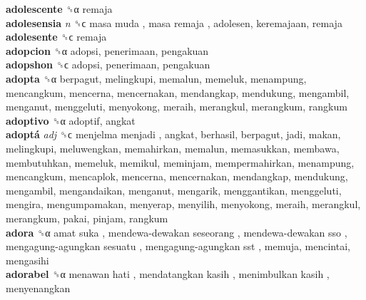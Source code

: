 \textbf{adolescente} ␝α  remaja  \\
\textbf{adolesensia} \emph{n}  ␝ϲ   masa muda ,  masa remaja , adolesen, keremajaan, remaja  \\
\textbf{adolesente} ␝ϲ  remaja  \\
\textbf{adopcion} ␝α  adopsi, penerimaan, pengakuan  \\
\textbf{adopshon} ␝ϲ  adopsi, penerimaan, pengakuan  \\
\textbf{adopta} ␝α  berpagut, melingkupi, memalun, memeluk, menampung, mencangkum, mencerna, mencernakan, mendangkap, mendukung, mengambil, menganut, menggeluti, menyokong, meraih, merangkul, merangkum, rangkum  \\
\textbf{adoptivo} ␝α  adoptif, angkat  \\
\textbf{adoptá} \emph{adj}  ␝ϲ   menjelma menjadi , angkat, berhasil, berpagut, jadi, makan, melingkupi, meluwengkan, memahirkan, memalun, memasukkan, membawa, membutuhkan, memeluk, memikul, meminjam, mempermahirkan, menampung, mencangkum, mencaplok, mencerna, mencernakan, mendangkap, mendukung, mengambil, mengandaikan, menganut, mengarik, menggantikan, menggeluti, mengira, mengumpamakan, menyerap, menyilih, menyokong, meraih, merangkul, merangkum, pakai, pinjam, rangkum  \\
\textbf{adora} ␝α   amat suka ,  mendewa-dewakan seseorang ,  mendewa-dewakan sso ,  mengagung-agungkan sesuatu ,  mengagung-agungkan sst , memuja, mencintai, mengasihi  \\
\textbf{adorabel} ␝α   menawan hati ,  mendatangkan kasih ,  menimbulkan kasih , menyenangkan  \\
